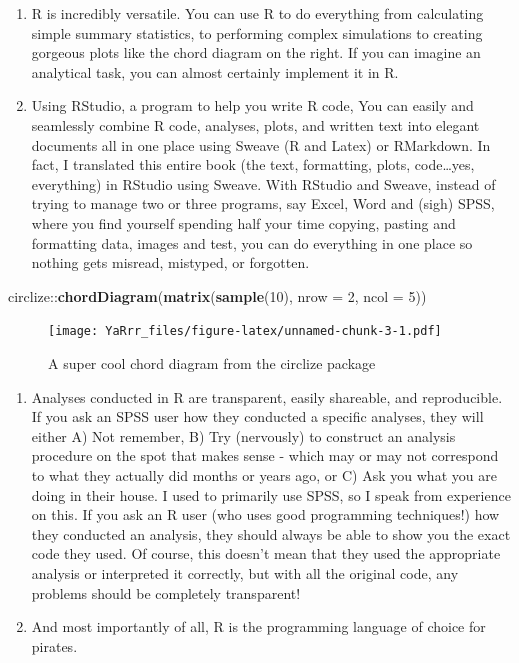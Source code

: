 \documentclass[]{book}
\newenvironment{Shaded}{\begin{snugshade}}{\end{snugshade}}
\newcommand{\KeywordTok}[1]{\textcolor[rgb]{0.13,0.29,0.53}{\textbf{{#1}}}}
\newcommand{\DataTypeTok}[1]{\textcolor[rgb]{0.13,0.29,0.53}{{#1}}}
\newcommand{\DecValTok}[1]{\textcolor[rgb]{0.00,0.00,0.81}{{#1}}}
\newcommand{\NormalTok}[1]{{#1}}
\theoremstyle{definition}
\theoremstyle{definition}
\theoremstyle{remark}
\begin{document}
\begin{enumerate}
\def\labelenumi{\arabic{enumi}.}
\setcounter{enumi}{2}
\item
  R is incredibly versatile. You can use R to do everything from
  calculating simple summary statistics, to performing complex
  simulations to creating gorgeous plots like the chord diagram on the
  right. If you can imagine an analytical task, you can almost certainly
  implement it in R.
\item
  Using RStudio, a program to help you write R code, You can easily and
  seamlessly combine R code, analyses, plots, and written text into
  elegant documents all in one place using Sweave (R and Latex) or
  RMarkdown. In fact, I translated this entire book (the text,
  formatting, plots, code\ldots{}yes, everything) in RStudio using
  Sweave. With RStudio and Sweave, instead of trying to manage two or
  three programs, say Excel, Word and (sigh) SPSS, where you find
  yourself spending half your time copying, pasting and formatting data,
  images and test, you can do everything in one place so nothing gets
  misread, mistyped, or forgotten.
\end{enumerate}

\begin{Shaded}
\begin{Highlighting}[]
\NormalTok{circlize::}\KeywordTok{chordDiagram}\NormalTok{(}\KeywordTok{matrix}\NormalTok{(}\KeywordTok{sample}\NormalTok{(}\DecValTok{10}\NormalTok{), }
                              \DataTypeTok{nrow =} \DecValTok{2}\NormalTok{, }\DataTypeTok{ncol =} \DecValTok{5}\NormalTok{))}
\end{Highlighting}
\end{Shaded}

\begin{figure}[htbp]
\centering
\texttt{[image: YaRrr\_files/figure-latex/unnamed-chunk-3-1.pdf]}
\caption{\label{fig:unnamed-chunk-3}A super cool chord diagram from the
circlize package}
\end{figure}

\begin{enumerate}
\def\labelenumi{\arabic{enumi}.}
\setcounter{enumi}{4}
\item
  Analyses conducted in R are transparent, easily shareable, and
  reproducible. If you ask an SPSS user how they conducted a specific
  analyses, they will either A) Not remember, B) Try (nervously) to
  construct an analysis procedure on the spot that makes sense - which
  may or may not correspond to what they actually did months or years
  ago, or C) Ask you what you are doing in their house. I used to
  primarily use SPSS, so I speak from experience on this. If you ask an
  R user (who uses good programming techniques!) how they conducted an
  analysis, they should always be able to show you the exact code they
  used. Of course, this doesn't mean that they used the appropriate
  analysis or interpreted it correctly, but with all the original code,
  any problems should be completely transparent!
\item
  And most importantly of all, R is the programming language of choice
  for pirates.
\end{enumerate}
\end{document}
